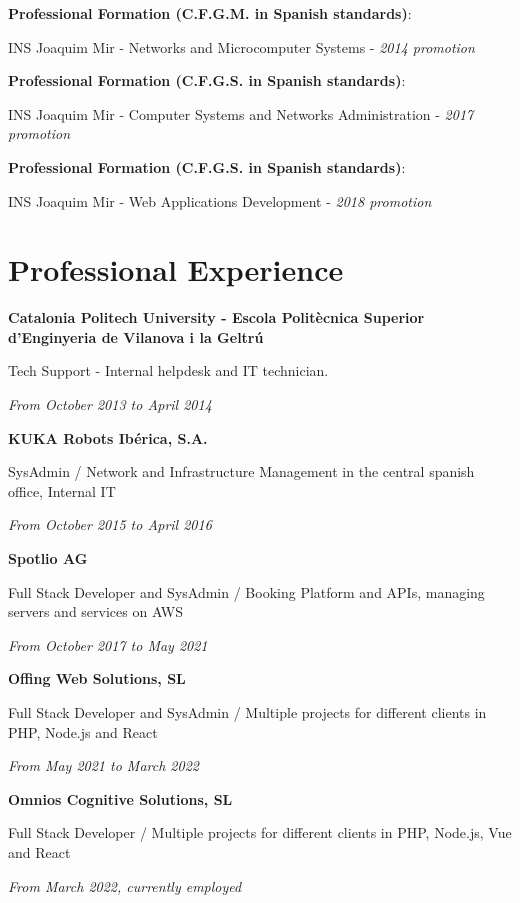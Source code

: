 \documentclass{article}
\newcommand\tab[1][0.5cm]{\hspace*{#1}}
\newcommand{\nl}{\vspace{3mm}}
\begin{document}
{	\textbf{Professional Formation (C.F.G.M. in Spanish standards)}:
	
	\tab INS Joaquim Mir - Networks and Microcomputer Systems - \textit{2014 promotion}
	
	\nl
	\textbf{Professional Formation (C.F.G.S. in Spanish standards)}:
	
	\tab INS Joaquim Mir - Computer Systems and Networks Administration - \textit{2017 promotion}
	
	\nl
	\textbf{Professional Formation (C.F.G.S. in Spanish standards)}:
	
	\tab INS Joaquim Mir - Web Applications Development - \textit{2018 promotion}
	
	\section*{Professional Experience}
	
	\textbf{Catalonia Politech University - Escola Politècnica Superior d'Enginyeria de Vilanova i la Geltrú}
	
	\tab Tech Support - Internal helpdesk and IT technician.
	
	\tab \textit{From October 2013 to April 2014}
	
	\nl
	\textbf{KUKA Robots Ibérica, S.A.}
	
	\tab SysAdmin / Network and Infrastructure Management in the central spanish office, Internal IT
	
	\tab \textit{From October 2015 to April 2016}

	\nl
	\textbf{Spotlio AG}
	
	\tab Full Stack Developer and SysAdmin / Booking Platform and APIs, managing servers and services on AWS
	
	\tab \textit{From October 2017 to May 2021}
	
	\nl
	\textbf{Offing Web Solutions, SL}
	
	\tab Full Stack Developer and SysAdmin / Multiple projects for different clients in PHP, Node.js and React
	
	\tab \textit{From May 2021 to March 2022}
	
	\nl
	\textbf{Omnios Cognitive Solutions, SL}
	
	\tab Full Stack Developer / Multiple projects for different clients in PHP, Node.js, Vue and React
	
	\tab \textit{From March 2022, currently employed}
	
}
\end{document}
